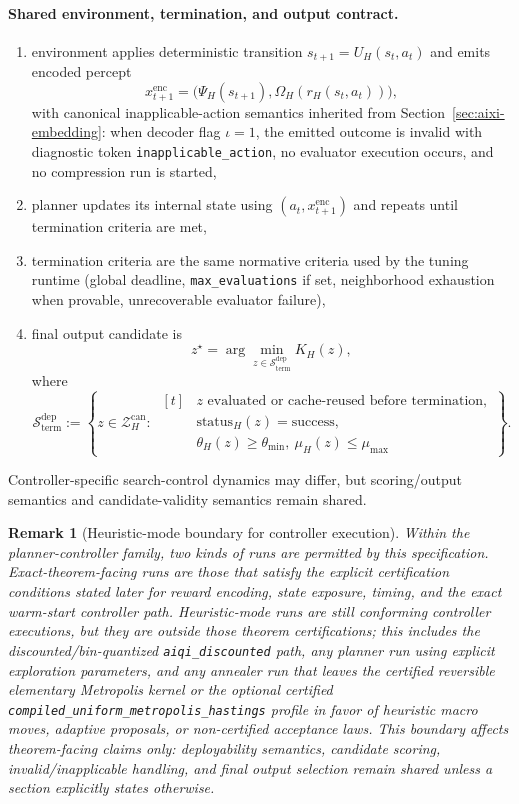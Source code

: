 \documentclass[11pt]{article}
\newtheorem{remark}{Remark}
\begin{document}
\paragraph{Shared environment, termination, and output contract.}
\begin{enumerate}
    \item environment applies deterministic transition
    $s_{t+1}=U_H(s_t,a_t)$ and emits encoded percept
    \[
    x_{t+1}^{\mathrm{enc}}=
    \bigl(\Psi_H(s_{t+1}),\Omega_H(r_H(s_t,a_t))\bigr),
    \]
    with canonical inapplicable-action semantics inherited from
    Section~\ref{sec:aixi-embedding}: when decoder flag $\iota=1$, the emitted
    outcome is invalid with diagnostic token
    \texttt{inapplicable\_action}, no evaluator execution occurs, and no
    compression run is started,
    \item planner updates its internal state using
    $(a_t,x_{t+1}^{\mathrm{enc}})$ and repeats until termination criteria are
    met,
    \item termination criteria are the same normative criteria used by the
    tuning runtime (global deadline, \texttt{max\_evaluations} if set,
    neighborhood exhaustion when provable, unrecoverable evaluator failure),
    \item final output candidate is
    \[
    z^\star=\arg\min_{z\in\mathcal{S}_{\mathrm{term}}^{\mathrm{dep}}}K_H(z),
    \]
    where
    \[
    \mathcal{S}_{\mathrm{term}}^{\mathrm{dep}}:=
    \left\{z\in\mathcal{Z}_H^{\mathrm{can}}:\
    \begin{aligned}[t]
    &z\text{ evaluated or cache-reused before termination},\\
    &\mathrm{status}_H(z)=\mathrm{success},\\
    &\theta_H(z)\ge\theta_{\min},\ \mu_H(z)\le\mu_{\max}
    \end{aligned}
    \right\}.
    \]
\end{enumerate}
Controller-specific search-control dynamics may differ, but scoring/output
semantics and candidate-validity semantics remain shared.

\begin{remark}[Heuristic-mode boundary for controller execution]
Within the planner-controller family, two kinds of runs are permitted by this
specification. Exact-theorem-facing runs are those that satisfy the explicit
certification conditions stated later for reward encoding, state exposure,
timing, and the exact warm-start controller path. Heuristic-mode runs are
still conforming controller executions, but they are outside those theorem
certifications; this includes the discounted/bin-quantized
\texttt{aiqi\_discounted} path, any planner run using explicit exploration
parameters, and any annealer run that leaves the certified reversible
elementary Metropolis kernel or the optional certified
\texttt{compiled\_uniform\_metropolis\_hastings} profile in favor of
heuristic macro moves, adaptive proposals, or non-certified acceptance laws.
This boundary affects theorem-facing claims only: deployability semantics,
candidate scoring, invalid/inapplicable handling, and final output selection
remain shared unless a section explicitly states otherwise.
\end{remark}
\end{document}
